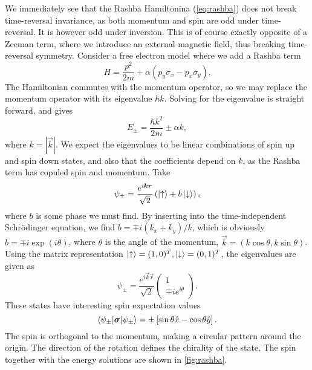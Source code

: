We immediately see that the Rashba Hamiltonina (\ref{eq:rashba}) does not break time-reversal invariance, as both momentum and spin are odd under time-reversal.
It is however odd under inversion.
This is of course exactly opposite of a Zeeman term, where we introduce an external magnetic field, thus breaking time-reversal symmetry.
Consider a free electron model where we add a Rashba term
\begin{equation}
  H = \frac{p^2}{2m} + \alpha (p_y \sigma _x - p_x \sigma _y).
\end{equation}
The Hamiltonian commutes with the momentum operator, so we may replace the momentum operator with its eigenvalue $\hbar k$.
Solving for the eigenvalue is straight forward, and gives
\begin{equation}
  E_{\pm} = \frac{\hbar k^2}{2m} \pm \alpha k,
\end{equation}
where $k=|\vec{k}|$.
We expect the eigenvalues to be linear combinations of spin up and spin down states, and also that the coefficients depend on $k$, as the Rashba term has copuled spin and momentum.
Take
\begin{equation}
  \psi_{\pm} = \frac{e^{i \bm{k} \bm{r}}}{\sqrt{2}} \left( \ket{\uparrow} + b \ket{\downarrow} \right),
\end{equation}
where $b$ is some phase we must find.
By inserting into the time-independent Schrödinger equation, we find $b = \mp i (k_x + k_y ) /k$, which is obviously $b=\mp i \exp (i \theta )$, where $\theta $ is the angle of the momentum, $\vec{k} = (k \cos \theta , k \sin \theta)$.
Using the matrix representation $\ket{\uparrow} = (1,0)^T, \ket{\downarrow} = (0,1)^T$, the eigenvalues are given as
\begin{equation}
  \psi _{\pm} =
  \frac{e^{i \vec{k} \vec{r}}}{\sqrt{2}}
  \begin{pmatrix}
    1\\
    \mp i e^{i \theta }
  \end{pmatrix}.
\end{equation}
These states have interesting spin expectation values
\begin{equation}
  \braket{\psi_{\pm} | \bm{\sigma} | \psi _{\pm}}
  =
  \pm
  \left[  
    \sin\theta \hat{x} - \cos \theta \hat{y}
  \right].
\end{equation}
The spin is orthogonal to the momentum, making a circular pattern around the origin.
The direction of the rotation defines the chirality of the state.
The spin together with the energy solutions are shown in \cref{fig:rashba}.


